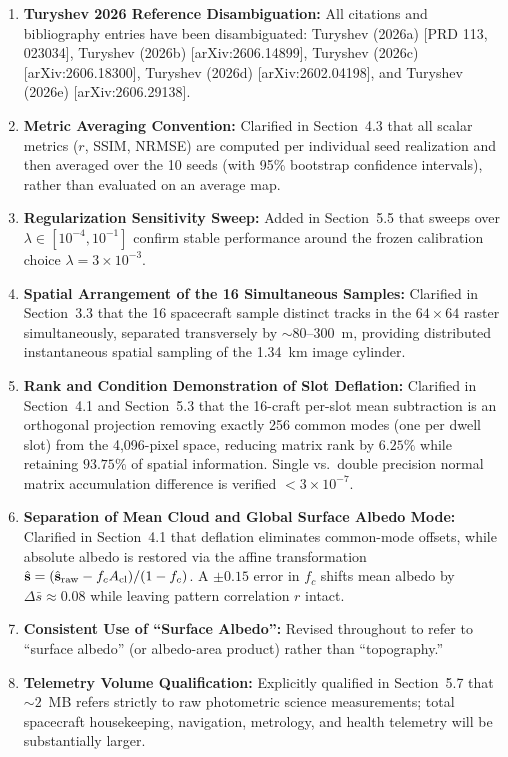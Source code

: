 \documentclass[11pt]{article}
\begin{document}
\begin{enumerate}
\item \textbf{Turyshev 2026 Reference Disambiguation:} All citations and bibliography entries have been disambiguated: Turyshev (2026a) [PRD 113, 023034], Turyshev (2026b) [arXiv:2606.14899], Turyshev (2026c) [arXiv:2606.18300], Turyshev (2026d) [arXiv:2602.04198], and Turyshev (2026e) [arXiv:2606.29138].
\item \textbf{Metric Averaging Convention:} Clarified in Section~4.3 that all scalar metrics ($r$, SSIM, NRMSE) are computed per individual seed realization and then averaged over the 10 seeds (with 95\% bootstrap confidence intervals), rather than evaluated on an average map.
\item \textbf{Regularization Sensitivity Sweep:} Added in Section~5.5 that sweeps over $\lambda \in [10^{-4}, 10^{-1}]$ confirm stable performance around the frozen calibration choice $\lambda = 3 \times 10^{-3}$.
\item \textbf{Spatial Arrangement of the 16 Simultaneous Samples:} Clarified in Section~3.3 that the 16 spacecraft sample distinct tracks in the $64\times64$ raster simultaneously, separated transversely by $\sim 80$--$300$~m, providing distributed instantaneous spatial sampling of the 1.34~km image cylinder.
\item \textbf{Rank and Condition Demonstration of Slot Deflation:} Clarified in Section~4.1 and Section~5.3 that the 16-craft per-slot mean subtraction is an orthogonal projection removing exactly 256 common modes (one per dwell slot) from the 4,096-pixel space, reducing matrix rank by $6.25\%$ while retaining $93.75\%$ of spatial information. Single vs.\ double precision normal matrix accumulation difference is verified $< 3 \times 10^{-7}$.
\item \textbf{Separation of Mean Cloud and Global Surface Albedo Mode:} Clarified in Section~4.1 that deflation eliminates common-mode offsets, while absolute albedo is restored via the affine transformation $\hat{\mathbf{s}} = (\hat{\mathbf{s}}_{\rm raw} - f_c A_{\rm cl}) / (1 - f_c)$. A $\pm 0.15$ error in $f_c$ shifts mean albedo by $\Delta\bar{s} \approx 0.08$ while leaving pattern correlation $r$ intact.
\item \textbf{Consistent Use of ``Surface Albedo'':} Revised throughout to refer to ``surface albedo'' (or albedo-area product) rather than ``topography.''
\item \textbf{Telemetry Volume Qualification:} Explicitly qualified in Section~5.7 that $\sim 2$~MB refers strictly to raw photometric science measurements; total spacecraft housekeeping, navigation, metrology, and health telemetry will be substantially larger.

\end{enumerate}
\end{document}
